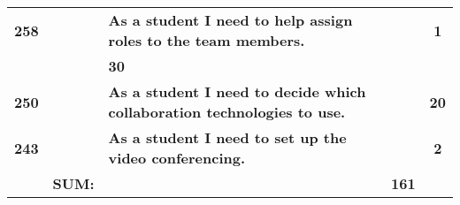 \begin{table*}[!ht]
\begin{tabularx}{\textwidth}{ccXcc}
\textbf{258} 	&
	& \textbf{As a student I need to help assign roles to the team members.} 						& 			& \textbf{1} \\

						&  			& \textbf{30} \\

\textbf{250} 	&
	& \textbf{As a student I need to decide which collaboration technologies to use.} 						& 			& \textbf{20} \\
\textbf{243} 	&
	& \textbf{As a student I need to set up the video conferencing.} 						& 			& \textbf{2} \\
\midrule
				& \textbf{SUM:}		&			& \textbf{161}
 \\																			
\bottomrule[1mm]
\end{tabularx}
\end{table*}